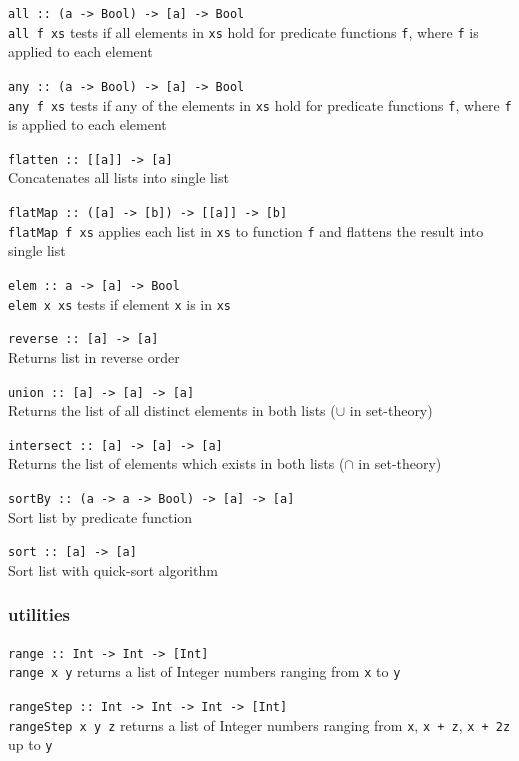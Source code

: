 \texttt{all :: (a -> Bool) -> [a] -> Bool}\ \\
\texttt{all f xs} tests if all elements in \texttt{xs} hold for predicate
   functions \texttt{f}, where \texttt{f} is applied to each element

\texttt{any :: (a -> Bool) -> [a] -> Bool}\ \\
\texttt{any f xs} tests if any of the elements in \texttt{xs} hold for predicate
   functions \texttt{f}, where \texttt{f} is applied to each element

\texttt{flatten :: [[a]] -> [a]}\ \\
Concatenates all lists into single list

\texttt{flatMap :: ([a] -> [b]) -> [[a]] -> [b]}\ \\
\texttt{flatMap f xs} applies each list in \texttt{xs} to function \texttt{f} and
   flattens the result into single list

\texttt{elem :: a -> [a] -> Bool}\ \\
\texttt{elem x xs} tests if element \texttt{x} is in \texttt{xs}

\texttt{reverse :: [a] -> [a]}\ \\
Returns list in reverse order

\texttt{union ::  [a] -> [a] -> [a]}\ \\
Returns the list of all distinct elements in both lists ($\cup$ in set-theory)

\texttt{intersect ::  [a] -> [a] -> [a]}\ \\
Returns the list of elements which exists in both lists ($\cap$ in set-theory)

\texttt{sortBy :: (a -> a -> Bool) -> [a] -> [a]}\ \\
Sort list by predicate function

\texttt{sort :: [a] -> [a]}\ \\
Sort list with quick-sort algorithm


\subsubsection{utilities}

\texttt{range :: Int -> Int -> [Int]}\ \\
\texttt{range x y} returns a list of Integer numbers ranging from \texttt{x} to \texttt{y}

\texttt{rangeStep :: Int -> Int -> Int -> [Int]}\ \\
\texttt{rangeStep x y z} returns a list of Integer numbers ranging from
   \texttt{x}, \texttt{x + z}, \texttt{x + 2z} up to \texttt{y}


